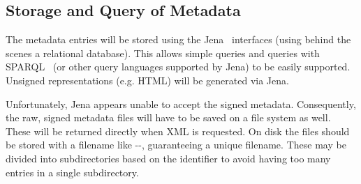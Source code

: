 \subsection{Storage and Query of Metadata}

The metadata entries will be stored using the Jena~\cite{jena}
interfaces (using behind the scenes a relational database).  This
allows simple queries and queries with SPARQL~\cite{sparql} (or other
query languages supported by Jena) to be easily supported.  Unsigned
representations (e.g. HTML) will be generated via Jena.

Unfortunately, Jena appears unable to accept the signed metadata.
Consequently, the raw, signed metadata files will have to be saved on
a file system as well.  These will be returned directly when XML is
requested.  On disk the files should be stored with a filename like
--,
guaranteeing a unique filename.  These may be divided into
subdirectories based on the identifier to avoid having too many
entries in a single subdirectory.


